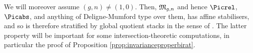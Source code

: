 \begin{remark}
\notready \label{Rmk:genus1n0}
We will moreover assume  $(g,n) \neq (1,0)$. Then, $\frak M_{g,n}$ and hence $\Picrel$, $\Picabs$, and anything of Deligne-Mumford type over them, has affine stabilisers, and so is therefore stratified by global quotient stacks in the sense of \cite{Kresch1999Cycle-groups-fo}. The latter property
will be important for some intersection-theoretic computations, in particular the proof of Proposition \ref{prop:invarianceproperbirat}.
\end{remark}




